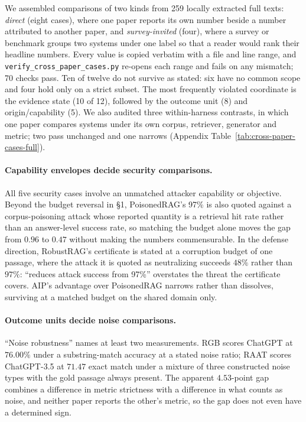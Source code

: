 \documentclass[11pt]{article}
\begin{document}
We assembled comparisons of two kinds from 259 locally extracted full texts:
\emph{direct} (eight cases), where one paper reports its own number beside a
number attributed to another paper, and \emph{survey-invited} (four), where a
survey or benchmark groups two systems under one label so that a reader would
rank their headline numbers. Every value is copied verbatim with a file and
line range, and \texttt{verify\_cross\_paper\_cases.py} re-opens each range and
fails on any mismatch; 70 checks pass. Ten of twelve do not survive as stated:
six have no common scope and four hold only on a strict subset. The most
frequently violated coordinate is the evidence state (10 of 12), followed by
the outcome unit (8) and origin/capability (5). We also audited three
within-harness contrasts, in which one paper compares systems under its own
corpus, retriever, generator and metric; two pass unchanged and one narrows
(Appendix Table~\ref{tab:cross-paper-cases-full}).

\paragraph{Capability envelopes decide security comparisons.}
All five security cases involve an unmatched attacker capability or objective.
Beyond the budget reversal in \S1, PoisonedRAG's 97\% is also quoted against a
corpus-poisoning attack whose reported quantity is a retrieval hit rate rather
than an answer-level success rate, so matching the budget alone moves the gap
from $0.96$ to $0.47$ without making the numbers commensurable. In the defense
direction, RobustRAG's certificate is stated at a corruption budget of one
passage, where the attack it is quoted as neutralizing succeeds $48\%$ rather
than $97\%$: ``reduces attack success from 97\%'' overstates the threat the
certificate covers. AIP's advantage over PoisonedRAG narrows rather than
dissolves, surviving at a matched budget on the shared domain only.

\paragraph{Outcome units decide noise comparisons.}
``Noise robustness'' names at least two measurements. RGB scores ChatGPT at
$76.00\%$ under a substring-match accuracy at a stated noise ratio; RAAT
scores ChatGPT-3.5 at $71.47$ exact match under a mixture of three
constructed noise types with the gold passage always present. The apparent
$4.53$-point gap combines a difference in metric strictness with a difference
in what counts as noise, and neither paper reports the other's metric, so the
gap does not even have a determined sign.
\end{document}
